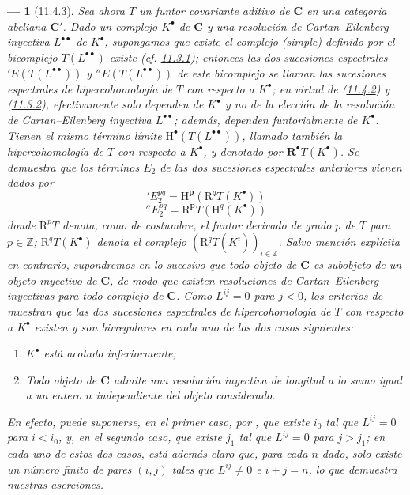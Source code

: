 \documentclass[10pt,oneside,openany]{book}
\theoremstyle{egaenv}\newtheorem*{env}{---}
\theoremstyle{egastatement}
\theoremstyle{egadescription}
\newcommand{\oldpage}[2][]{\marginnote{\normalfont\scriptsize\textbf{#1}\,|\,#2}\ignorespaces}
\begin{document}
\begin{env}[11.4.3]
\label{0.11.4.3}
\label{0.11.4.3-fr}
Sea ahora $T$ un \emph{funtor covariante aditivo} de $\boldsymbol{C}$ en una categoría abeliana $\boldsymbol{C}'$.
Dado un complejo $K^\bullet$ de $\boldsymbol{C}$ y una resolución de Cartan--Eilenberg \emph{inyectiva} $L^{\bullet\bullet}$ de $K^\bullet$, supongamos que existe el complejo (simple) definido por el bicomplejo $T(L^{\bullet\bullet})$ existe
(cf. \hyperref[0.11.3.1-fr]{11.3.1}); entonces las dos sucesiones espectrales
$'E(T(L^{\bullet\bullet}))$ y $''E(T(L^{\bullet\bullet}))$ de este bicomplejo se llaman las \emph{sucesiones espectrales de hipercohomología} de $T$ con respecto a $K^\bullet$; en virtud de (\hyperref[0.11.4.2-fr]{11.4.2}) y (\hyperref[0.11.3.2-fr]{11.3.2}), efectivamente solo dependen de $K^\bullet$ y no de la elección de la resolución de Cartan--Eilenberg inyectiva $L^{\bullet\bullet}$;
además, dependen \emph{funtorialmente} de $K^\bullet$.
Tienen el mismo término límite $\mathrm H^\bullet(T(L^{\bullet\bullet}))$, llamado también la \emph{hipercohomología} de $T$ con respecto a $K^\bullet$, y denotado por $\mathbf R^\bullet T(K^\bullet)$.
Se demuestra que los términos $E_2$ de las dos sucesiones espectrales anteriores vienen dados por
\[
  \label{0.11.4.3.1-fr}
  'E_2^{pq}=\mathrm H^{\boldsymbol{p}}(\mathrm R^qT(K^\bullet))
  \tag{11.4.3.1}
\]
\[
  \label{0.11.4.3.2-fr}
  ''E_2^{pq}=\mathrm R^{\boldsymbol{p}}T(\mathrm H^q(K^\bullet))
  \tag{11.4.3.2}
\]
\oldpage[0\textsubscript{III}]{34}
donde $\mathrm R^pT$ denota, como de costumbre, el \emph{funtor derivado} de grado $p$ de $T$ para $p\in\mathbb Z$;
$\mathrm R^qT(K^\bullet)$ denota el complejo $(\mathrm R^qT(K^i))_{i\in\mathbb Z}$.
\label{0.11.4.4}
\label{0.11.4.4-fr}
Salvo mención explícita en contrario, supondremos en lo sucesivo que todo objeto de $\boldsymbol{C}$ es subobjeto de un objeto inyectivo de $\boldsymbol{C}$, de modo que existen resoluciones de Cartan--Eilenberg inyectivas para todo complejo de $\boldsymbol{C}$.
Como $L^{ij}=0$ para $j<0$, los criterios de  muestran que las \emph{dos} sucesiones espectrales de hipercohomología de $T$ con respecto a $K^\bullet$ existen y
son \emph{birregulares} en cada uno de los dos casos siguientes:
\begin{enumerate}
  \item[$1^\circ$] $K^\bullet$ está acotado inferiormente;
  \item[$2^\circ$] Todo objeto de $\boldsymbol{C}$ admite una resolución inyectiva
de longitud a lo sumo igual a un entero $n$ independiente del objeto considerado.
\end{enumerate}
En efecto, puede suponerse, en el primer caso, por , que existe $i_0$ tal que $L^{ij}=0$ para $i<i_0$, y, en el segundo caso, que existe $j_1$ tal que $L^{ij}=0$ para $j>j_1$;
en cada uno de estos dos casos, está además claro que, para cada $n$ dado, solo existe un número finito de pares $(i,j)$ tales que $L^{ij}\neq0$ e $i+j=n$, lo que demuestra nuestras aserciones.


\end{env}
\end{document}
